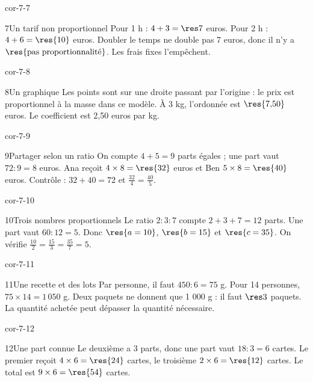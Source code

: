 \begin{blocLivre}{cor-7-7}\begin{corrige}{7}{Un tarif non proportionnel}
Pour 1 h : $4+3=\res7$ euros. Pour 2 h : $4+6=\res{10}$ euros. Doubler le temps ne double pas 7 euros, donc il n’y a $\res{\text{pas proportionnalité}}$. Les frais fixes l’empêchent.
\end{corrige}\end{blocLivre}
\begin{blocLivre}{cor-7-8}\begin{corrige}{8}{Un graphique}
Les points sont sur une droite passant par l’origine : le prix est proportionnel à la masse dans ce modèle. À 3 kg, l’ordonnée est $\res{7{,}50}$ euros. Le coefficient est 2,50 euros par kg.
\label{fig-cor-7-8}
\end{corrige}\end{blocLivre}
\begin{blocLivre}{cor-7-9}\begin{corrige}{9}{Partager selon un ratio}
On compte $4+5=9$ parts égales ; une part vaut $72:9=8$ euros. Ana reçoit $4\times8=\res{32}$ euros et Ben $5\times8=\res{40}$ euros. Contrôle : $32+40=72$ et $\frac{32}4=\frac{40}5$.
\label{fig-cor-7-9}
\end{corrige}\end{blocLivre}
\begin{blocLivre}{cor-7-10}\begin{corrige}{10}{Trois nombres proportionnels}
Le ratio $2:3:7$ compte $2+3+7=12$ parts. Une part vaut $60:12=5$. Donc $\res{a=10}$, $\res{b=15}$ et $\res{c=35}$. On vérifie $\frac{10}2=\frac{15}3=\frac{35}7=5$.
\end{corrige}\end{blocLivre}
\begin{blocLivre}{cor-7-11}\begin{corrige}{11}{Une recette et des lots}
Par personne, il faut $450:6=75$ g. Pour 14 personnes, $75\times14=1\,050$ g. Deux paquets ne donnent que 1 000 g : il faut $\res3$ paquets. La quantité achetée peut dépasser la quantité nécessaire.
\end{corrige}\end{blocLivre}
\begin{blocLivre}{cor-7-12}\begin{corrige}{12}{Une part connue}
Le deuxième a 3 parts, donc une part vaut $18:3=6$ cartes. Le premier reçoit $4\times6=\res{24}$ cartes, le troisième $2\times6=\res{12}$ cartes. Le total est $9\times6=\res{54}$ cartes.
\end{corrige}\end{blocLivre}
